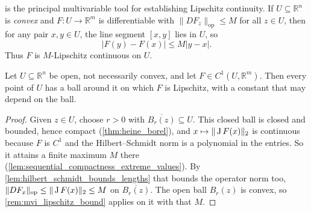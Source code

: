 \begin{center}
\end{center}

\begin{remark}
\label{rem:mvi_lipschitz_bound}
 is the principal multivariable tool for establishing Lipschitz continuity. If $U \subseteq \mathbb{R}^n$ is \emph{convex} and $F : U \to \mathbb{R}^m$ is differentiable with $\|DF_z\|_{\mathrm{op}} \leq M$ for all $z \in U$, then for any pair $x, y \in U$, the line segment $[x, y]$ lies in $U$, so
\[
|F(y) - F(x)| \leq M |y - x|.
\]
Thus $F$ is $M$-Lipschitz continuous on $U$.
\end{remark}

\begin{corollary}
\label{cor:c1_locally_lipschitz}
Let $U \subseteq \mathbb{R}^n$ be open, not necessarily convex, and let
$F \in C^1(U,\mathbb{R}^m)$. Then every point of $U$ has a ball around it on which $F$ is
Lipschitz, with a constant that may depend on the ball.
\end{corollary}

\begin{proof}
Given $z \in U$, choose $r > 0$ with $\overline{B_r(z)} \subseteq U$. This closed ball is closed
and bounded, hence compact (\cref{thm:heine_borel}), and $x \mapsto \|\operatorname{J} F(x)\|_2$ is
continuous because $F$ is $C^1$ and the Hilbert--Schmidt norm is a polynomial in the entries. So
it attains a finite maximum $M$ there (\cref{lem:sequential_compactness_extreme_values}). By
\cref{lem:hilbert_schmidt_bounds_lengths} that bounds the operator norm too,
$\|DF_x\|_{\mathrm{op}} \leq \|\operatorname{J} F(x)\|_2 \leq M$ on $\overline{B_r(z)}$. The open ball
$B_r(z)$ is convex, so \cref{rem:mvi_lipschitz_bound} applies on it with that $M$.
\end{proof}

